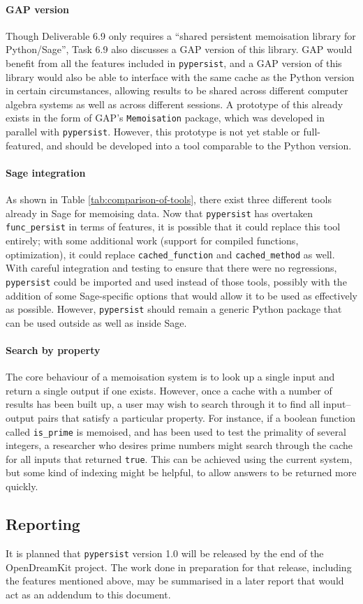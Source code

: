 \documentclass{deliverablereport}
\newcommand{\pypersist}{\texttt{pypersist}}
\begin{document}
\paragraph{GAP version}
Though Deliverable 6.9 only requires a ``shared persistent memoisation library
for Python/Sage'', Task 6.9 also discusses a GAP version of this library.  GAP
would benefit from all the features included in \pypersist{}, and a GAP version
of this library would also be able to interface with the same cache as the
Python version in certain circumstances, allowing results to be shared across
different computer algebra systems as well as across different sessions.  A
prototype of this already exists in the form of GAP's \texttt{Memoisation}
package, which was developed in parallel with \pypersist{}.  However, this
prototype is not yet stable or full-featured, and should be developed into a
tool comparable to the Python version.

\paragraph{Sage integration}
As shown in Table \ref{tab:comparison-of-tools}, there exist three different
tools already in Sage for memoising data.  Now that \pypersist{} has overtaken
\texttt{func_persist} in terms of features, it is possible that it could replace this tool
entirely; with some additional work (support for compiled functions,
optimization), it could replace \texttt{cached_function} and
\texttt{cached_method} as well.
With careful integration and testing to ensure that there were no
regressions, \pypersist{} could be imported and used instead of those tools,
possibly with the addition of some Sage-specific options that would allow it to
be used as effectively as possible.  However, \pypersist{} should remain a
generic Python package that can be used outside as well as inside Sage.

\paragraph{Search by property}
The core behaviour of a memoisation system is to look up a single input and
return a single output if one exists.  However, once a cache with a number of
results has been built up, a user may wish to search through it to find all
input--output pairs that satisfy a particular property.  For instance, if a
boolean function called \texttt{is\_prime} is memoised, and has been used to
test the primality of several integers, a researcher who desires prime numbers
might search through the cache for all inputs that returned \texttt{true}.  This
can be achieved using the current system, but some kind of indexing might be
helpful, to allow answers to be returned more quickly.

\subsection{Reporting}
It is planned that \pypersist{} version 1.0 will be released by the end of the
OpenDreamKit project.  The work done in preparation for that release, including
the features mentioned above, may be summarised in a later report that would act
as an addendum to this document.
\end{document}
